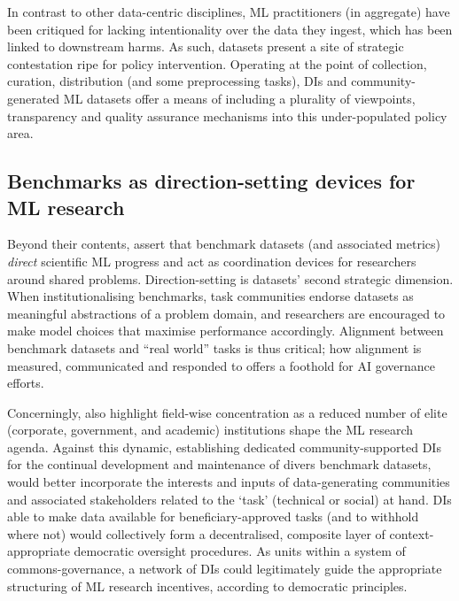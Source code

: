 In contrast to other data-centric disciplines, ML practitioners (in aggregate) have been critiqued for lacking intentionality over the data they ingest, which has been linked to downstream harms. As such, datasets present a site of strategic contestation ripe for policy intervention. Operating at the point of collection, curation, distribution (and some preprocessing tasks), DIs and community-generated ML datasets offer a means of including a plurality of viewpoints, transparency and quality assurance mechanisms into this under-populated policy area.

\subsection*{Benchmarks as direction-setting devices for ML research}

Beyond their contents, \textcite{koch2021ReducedReusedRecycled} assert that benchmark datasets (and associated metrics) \textit{direct} scientific ML progress and act as coordination devices for researchers around shared problems. Direction-setting is datasets' second strategic dimension. When institutionalising benchmarks, task communities endorse datasets as meaningful abstractions of a problem domain, and researchers are encouraged to make model choices that maximise performance accordingly. Alignment between benchmark datasets and “real world” tasks is thus critical; how alignment is measured, communicated and responded to offers a foothold for AI governance efforts. 

Concerningly, \textcite{koch2021ReducedReusedRecycled} also highlight field-wise concentration as a reduced number of elite (corporate, government, and academic) institutions shape the ML research agenda. Against this dynamic, establishing dedicated community-supported DIs for the continual development and maintenance of divers benchmark datasets, would better incorporate the interests and inputs of data-generating communities and associated stakeholders related to the `task' (technical or social) at hand. DIs able to make data available for beneficiary-approved tasks (and to withhold where not) would collectively form a decentralised, composite layer of context-appropriate democratic oversight procedures. As units within a system of commons-governance, a network of DIs could legitimately guide the appropriate structuring of ML research incentives, according to democratic principles. 

